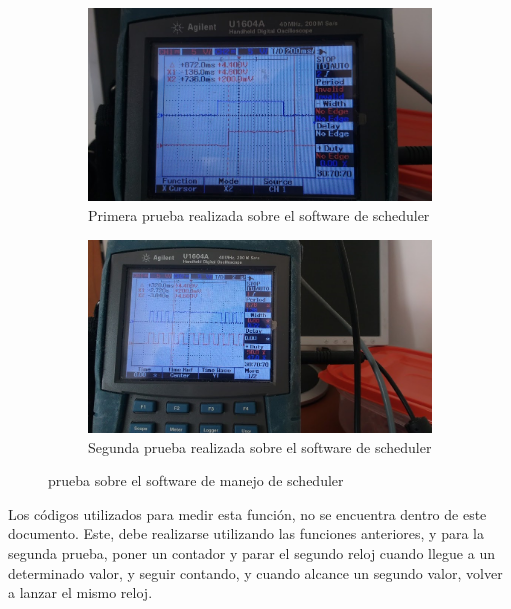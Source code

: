 \begin{figure}[ht]
	\begin{subfigure}{0.5\linewidth}
		\centering
		\includegraphics[width=\linewidth]{osciloscopio_im1} 
		\caption{Primera prueba realizada sobre el software de scheduler}
		\label{fig:osc_m1}	
	\end{subfigure}
	\hfill
	\begin{subfigure}{0.5\linewidth}
		\centering
		\includegraphics[width=\linewidth]{osciloscopio_im2}
		\caption{Segunda prueba realizada sobre el software de scheduler} 
		\label{fig:osc_m2}		
	\end{subfigure}
	\caption{prueba sobre el software de manejo de scheduler}
\end{figure}

Los códigos utilizados para medir esta función, no se encuentra dentro de este documento. Este, debe realizarse utilizando las funciones anteriores, y para la segunda prueba, poner un contador y parar el segundo reloj cuando llegue a un determinado valor, y seguir contando, y cuando alcance un segundo valor, volver a lanzar el mismo reloj. 

